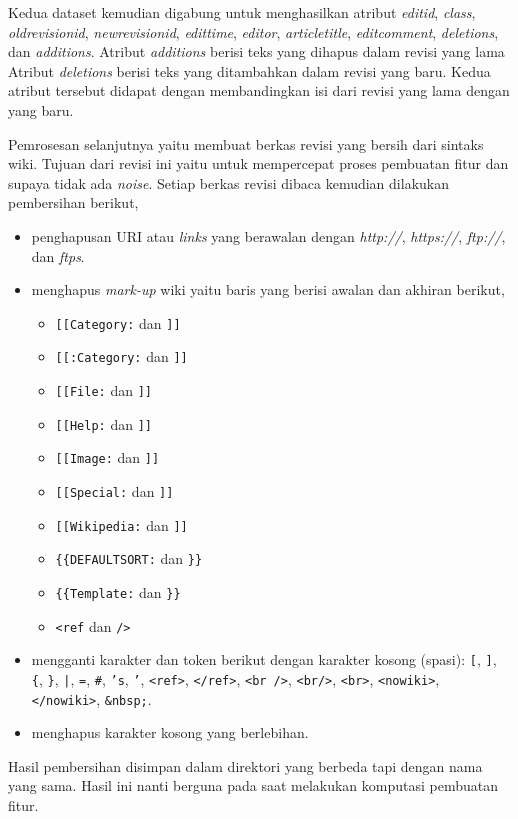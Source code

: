 Kedua dataset kemudian digabung untuk menghasilkan atribut \textit{editid},
\textit{class}, \textit{oldrevisionid}, \textit{newrevisionid},
\textit{edittime}, \textit{editor}, \textit{articletitle},
\textit{editcomment}, \textit{deletions}, dan \textit{additions}.
Atribut \textit{additions} berisi teks yang dihapus dalam revisi yang lama
Atribut \textit{deletions} berisi teks yang ditambahkan dalam revisi yang baru.
Kedua atribut tersebut didapat dengan membandingkan isi dari revisi yang lama
dengan yang baru.

Pemrosesan selanjutnya yaitu membuat berkas revisi yang bersih dari sintaks
wiki.
Tujuan dari revisi ini yaitu untuk mempercepat proses pembuatan fitur dan
supaya tidak ada \textit{noise}.
Setiap berkas revisi dibaca kemudian dilakukan pembersihan berikut,

\begin{itemize}
\item penghapusan URI atau \textit{links} yang berawalan dengan
\textit{http://}, \textit{https://}, \textit{ftp://}, dan \textit{ftps}.
\item menghapus \textit{mark-up} wiki yaitu baris yang berisi awalan dan
akhiran berikut,
	\begin{itemize}
	\item \texttt{[[Category:} dan \texttt{]]}
	\item \texttt{[[:Category:} dan \texttt{]]}
	\item \texttt{[[File:} dan \texttt{]]}
	\item \texttt{[[Help:} dan \texttt{]]}
	\item \texttt{[[Image:} dan \texttt{]]}
	\item \texttt{[[Special:} dan \texttt{]]}
	\item \texttt{[[Wikipedia:} dan \texttt{]]}
	\item \texttt{\{\{DEFAULTSORT:} dan \texttt{\}\}}
	\item \texttt{\{\{Template:} dan \texttt{\}\}}
	\item \texttt{<ref} dan \texttt{/>}
	\end{itemize}
\item mengganti karakter dan token berikut dengan karakter kosong (spasi):
\texttt{[}, \texttt{]}, \texttt{\{}, \texttt{\}}, \texttt{|}, \texttt{=},
\texttt{\#}, \texttt{'s}, \texttt{'}, \texttt{<ref>}, \texttt{</ref>},
\texttt{<br />}, \texttt{<br/>}, \texttt{<br>}, \texttt{<nowiki>},
\texttt{</nowiki>}, \texttt{\&nbsp;}.
\item menghapus karakter kosong yang berlebihan.
\end{itemize}

Hasil pembersihan disimpan dalam direktori yang berbeda tapi dengan nama yang
sama.
Hasil ini nanti berguna pada saat melakukan komputasi pembuatan fitur.
